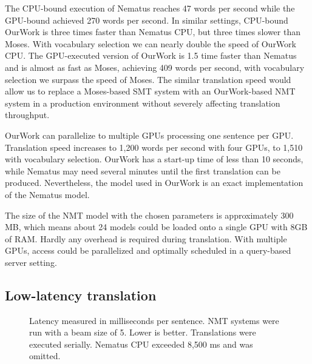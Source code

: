 \documentclass[11pt]{article}
\begin{document}
The CPU-bound execution of Nematus reaches 47 words per second while the GPU-bound achieved 270 words per second. In similar settings, CPU-bound OurWork is three times faster than Nematus CPU, but three times slower than Moses. With vocabulary selection we can nearly double the speed of OurWork CPU. The GPU-executed version of OurWork is 1.5 time faster than Nematus and is almost as fast as Moses, achieving 409 words per second, with vocabulary selection we surpass the speed of Moses. The similar translation speed would allow us to replace a Moses-based SMT system with an OurWork-based NMT system in a production environment without severely affecting translation throughput. 

OurWork can parallelize to multiple GPUs processing one sentence per GPU. Translation speed increases to 1,200 words per second with four GPUs, to 1,510 with vocabulary selection. 
OurWork has a start-up time of less than 10 seconds, while Nematus may need several minutes until the first translation can be produced. Nevertheless, the model used in OurWork is an exact implementation of the Nematus model.

The size of the NMT model with the chosen parameters is approximately 300 MB, which means about 24 models could be loaded onto a single GPU with 8GB of RAM. Hardly any overhead is required during translation. With multiple GPUs, access could be parallelized and optimally scheduled in a query-based server setting. 

\subsection{Low-latency translation}

\begin{figure}[t]
\centering
{}
\caption{Latency measured in milliseconds per sentence. NMT systems were run with a beam size of 5. Lower is better. Translations were executed serially. Nematus CPU exceeded 8,500 ms and was omitted.}\label{latency}
\end{figure}
\end{document}

